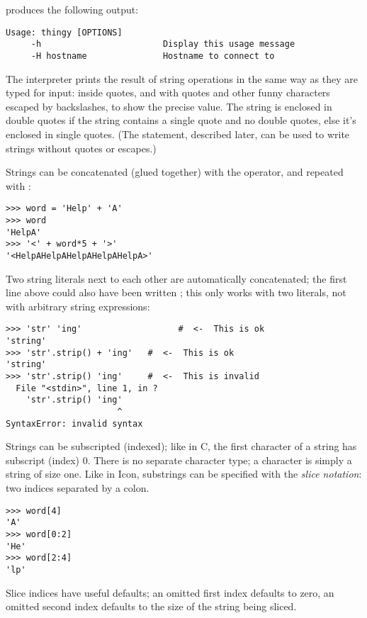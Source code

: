 \documentclass{manual}
\begin{document}
produces the following output:

\begin{verbatim}
Usage: thingy [OPTIONS] 
     -h                        Display this usage message
     -H hostname               Hostname to connect to
\end{verbatim}

The interpreter prints the result of string operations in the same way
as they are typed for input: inside quotes, and with quotes and other
funny characters escaped by backslashes, to show the precise
value.  The string is enclosed in double quotes if the string contains
a single quote and no double quotes, else it's enclosed in single
quotes.  (The  statement, described later, can be used
to write strings without quotes or escapes.)

Strings can be concatenated (glued together) with the
\code{+} operator, and repeated with \code{*}:

\begin{verbatim}
>>> word = 'Help' + 'A'
>>> word
'HelpA'
>>> '<' + word*5 + '>'
'<HelpAHelpAHelpAHelpAHelpA>'
\end{verbatim}

Two string literals next to each other are automatically concatenated;
the first line above could also have been written ; this only works with two literals, not with arbitrary string
expressions:

\begin{verbatim}
>>> 'str' 'ing'                   #  <-  This is ok
'string'
>>> 'str'.strip() + 'ing'   #  <-  This is ok
'string'
>>> 'str'.strip() 'ing'     #  <-  This is invalid
  File "<stdin>", line 1, in ?
    'str'.strip() 'ing'
                      ^
SyntaxError: invalid syntax
\end{verbatim}

Strings can be subscripted (indexed); like in C, the first character
of a string has subscript (index) 0.  There is no separate character
type; a character is simply a string of size one.  Like in Icon,
substrings can be specified with the \emph{slice notation}: two indices
separated by a colon.

\begin{verbatim}
>>> word[4]
'A'
>>> word[0:2]
'He'
>>> word[2:4]
'lp'
\end{verbatim}

Slice indices have useful defaults; an omitted first index defaults to
zero, an omitted second index defaults to the size of the string being
sliced.
\end{document}
